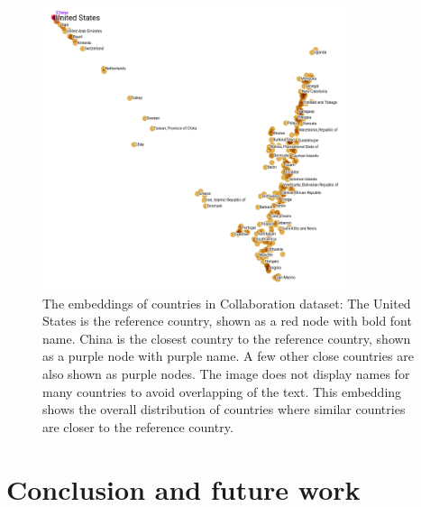 \documentclass[book,12pt]{WSUThesis}
\theoremstyle{definition}
\begin{document}
\begin{figure}[!ht]\centering
	\includegraphics[width=0.8\textwidth]{countries-annotation}
	\caption{
		The embeddings of countries in Collaboration dataset:
		The United States is the reference country, shown as a red node with bold font name.
		China is the closest country to the reference country, shown as a purple node with purple name.
		A few other close countries are also shown as purple nodes.
		The image does not display names for many countries to avoid overlapping of the text.
		This embedding shows the overall distribution of countries where similar countries are closer to the reference country.
	}
	\label{fig:countries}
\end{figure}

\chapter{Conclusion and future work}
\end{document}
